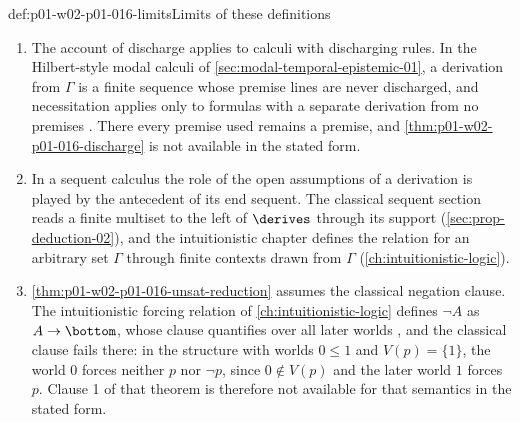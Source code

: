 \begin{hbwarning}{def:p01-w02-p01-016-limits}{Limits of these definitions}
\begin{enumerate}
  \item The account of discharge applies to calculi with discharging rules.
        In the Hilbert-style modal calculi of
        \cref{sec:modal-temporal-epistemic-01}, a derivation from \(\Gamma\)
        is a finite sequence whose premise lines are never discharged, and
        necessitation applies only to formulas with a separate derivation
        from no premises \cite[ch.~``Modal, Temporal, and Epistemic Logic'',
        section ``Normal propositional modal logic'']{FrozenFormalLogicSemanticData}.
        There every premise used remains a premise, and
        \cref{thm:p01-w02-p01-016-discharge} is not available in the stated
        form.
  \item In a sequent calculus the role of the open assumptions of a
        derivation is played by the antecedent of its end sequent. The
        classical sequent section reads a finite multiset to the left of
        \(\derives\) through its support (\cref{sec:prop-deduction-02}), and
        the intuitionistic chapter defines the relation for an arbitrary set
        \(\Gamma\) through finite contexts drawn from \(\Gamma\)
        (\cref{ch:intuitionistic-logic}).
  \item \cref{thm:p01-w02-p01-016-unsat-reduction} assumes the classical
        negation clause. The intuitionistic forcing relation of
        \cref{ch:intuitionistic-logic} defines \(\neg A\) as
        \(A\to\bottom\), whose clause quantifies over all later worlds
        \cite[ch.~``Intuitionistic Logic'']{FrozenFormalLogicSemanticData},
        and the classical clause fails there: in the structure with worlds
        \(0\le1\) and \(V(p)=\{1\}\), the world \(0\) forces neither \(p\)
        nor \(\neg p\), since \(0\notin V(p)\) and the later world \(1\)
        forces \(p\). Clause 1 of that theorem is therefore not available for
        that semantics in the stated form.
\end{enumerate}
\end{hbwarning}

